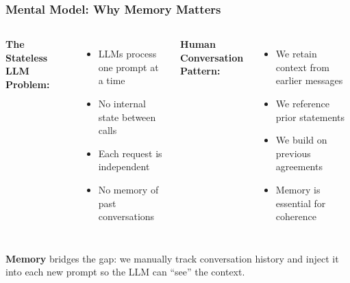 \documentclass[aspectratio=169,11pt]{beamer}
\begin{document}
\begin{frame}
  \frametitle{Mental Model: Why Memory Matters}
  \begin{columns}
    \textbf{The Stateless LLM Problem:}
    \begin{itemize}
\setlength{\itemsep}{1pt}
      \item LLMs process one prompt at a time
      \item No internal state between calls
      \item Each request is independent
      \item No memory of past conversations
    \end{itemize}

    \textbf{Human Conversation Pattern:}
    \begin{itemize}
\setlength{\itemsep}{1pt}
      \item We retain context from earlier messages
      \item We reference prior statements
      \item We build on previous agreements
      \item Memory is essential for coherence
    \end{itemize}
  \end{columns}
  \vspace{0.8em}
  \begin{conceptbox}
    \textbf{Memory} bridges the gap: we manually track conversation history and
    inject it into each new prompt so the LLM can ``see'' the context.
  \end{conceptbox}
\end{frame}
\end{document}
